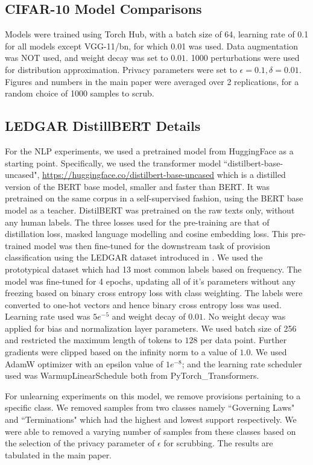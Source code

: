 \subsection{CIFAR-10 Model Comparisons}
Models were trained using Torch Hub, with a batch size of 64, learning rate of 0.1 for all models except VGG-11/bn, for which 0.01 was used. Data augmentation was NOT used, and weight decay was set to $0.01$.
1000 perturbations were used for distribution approximation. Privacy parameters were set to $\epsilon=0.1, \delta=0.01$.
Figures and numbers in the main paper were averaged over 2 replications, for a random choice of 1000 samples to scrub.

\subsection{LEDGAR DistillBERT Details}
For the NLP experiments, we used a pretrained model from HuggingFace as a starting point. Specifically, we used the transformer model ``distilbert-base-uncased", \url{https://huggingface.co/distilbert-base-uncased} which is a distilled version of the BERT base model, smaller and faster than BERT. It was pretrained on the same corpus in a self-supervised fashion, using the BERT base model as a teacher. DistilBERT \cite{sanh2019distilbert} was pretrained on the raw texts only, without any human labels. The three losses used for the pre-training are that of distillation loss, masked language modelling and cosine embedding loss. This pre-trained model was then fine-tuned for the downstream task of provision classification using the LEDGAR dataset introduced in \cite{tuggener2020ledgar}. We used the prototypical dataset which had 13 most common labels based on frequency. The model was fine-tuned for 4 epochs, updating all of it's parameters without any freezing based on binary cross entropy loss with class weighting. The labels were converted to one-hot vectors and hence binary cross entropy loss was used. Learning rate used was $5e^{-5}$ and weight decay of $0.01$. No weight decay was applied for bias and normalization layer parameters. We used batch size of 256 and restricted the maximum length of tokens to $128$ per data point. Further gradients were clipped based on the infinity norm to a value of $1.0$. We used AdamW optimizer with an epsilon value of $1e^{-8}$; and the learning rate scheduler used was WarmupLinearSchedule both from PyTorch\_Transformers. 

For unlearning experiments on this model, we remove provisions pertaining to a specific class. We removed samples from two classes namely ``Governing Laws" and ``Terminations" which had the highest and lowest support respectively. We were able to removed a varying number of samples from these classes based on the selection of the privacy parameter of $\epsilon$ for scrubbing. The results are tabulated in the main paper.


